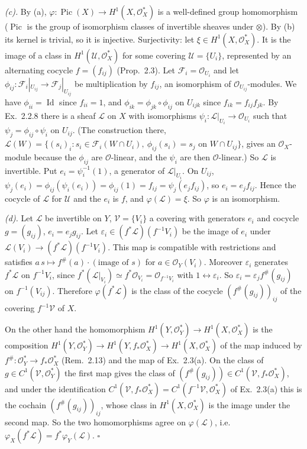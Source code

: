 \documentclass[11pt]{article}
\begin{document}
\emph{(c).} By (a), $\varphi:\operatorname{Pic}(X)\to H^1(X,\mathcal O_X^*)$ is a well-defined group homomorphism ($\operatorname{Pic}$ is the group of isomorphism classes of invertible sheaves under $\otimes$). By (b) its kernel is trivial, so it is injective. Surjectivity: let $\xi\in H^1(X,\mathcal O_X^*)$. It is the image of a class in $H^1(\mathcal U,\mathcal O_X^*)$ for some covering $\mathcal U=\{U_i\}$, represented by an alternating cocycle $f=(f_{ij})$ (Prop.~2.3). Let $\mathcal F_i=\mathcal O_{U_i}$ and let $\phi_{ij}:\mathcal F_i|_{U_{ij}}\to\mathcal F_j|_{U_{ij}}$ be multiplication by $f_{ij}$, an isomorphism of $\mathcal O_{U_{ij}}$-modules. We have $\phi_{ii}=\operatorname{Id}$ since $f_{ii}=1$, and $\phi_{ik}=\phi_{jk}\circ\phi_{ij}$ on $U_{ijk}$ since $f_{ik}=f_{ij}f_{jk}$. By Ex.~2.2.8 there is a sheaf $\mathcal L$ on $X$ with isomorphisms $\psi_i:\mathcal L|_{U_i}\to\mathcal O_{U_i}$ such that $\psi_j=\phi_{ij}\circ\psi_i$ on $U_{ij}$. (The construction there, $\mathcal L(W)=\{(s_i)_i:s_i\in\mathcal F_i(W\cap U_i),\ \phi_{ij}(s_i)=s_j\text{ on }W\cap U_{ij}\}$, gives an $\mathcal O_X$-module because the $\phi_{ij}$ are $\mathcal O$-linear, and the $\psi_i$ are then $\mathcal O$-linear.) So $\mathcal L$ is invertible. Put $e_i=\psi_i^{-1}(1)$, a generator of $\mathcal L|_{U_i}$. On $U_{ij}$, $\psi_j(e_i)=\phi_{ij}(\psi_i(e_i))=\phi_{ij}(1)=f_{ij}=\psi_j(e_jf_{ij})$, so $e_i=e_jf_{ij}$. Hence the cocycle of $\mathcal L$ for $\mathcal U$ and the $e_i$ is $f$, and $\varphi(\mathcal L)=\xi$. So $\varphi$ is an isomorphism.

\emph{(d).} Let $\mathcal L$ be invertible on $Y$, $\mathcal V=\{V_i\}$ a covering with generators $e_i$ and cocycle $g=(g_{ij})$, $e_i=e_jg_{ij}$. Let $\varepsilon_i\in(f^*\mathcal L)(f^{-1}V_i)$ be the image of $e_i$ under $\mathcal L(V_i)\to(f^*\mathcal L)(f^{-1}V_i)$. This map is compatible with restrictions and satisfies $a\,s\mapsto f^\#(a)\cdot(\text{image of }s)$ for $a\in\mathcal O_Y(V_i)$. Moreover $\varepsilon_i$ generates $f^*\mathcal L$ on $f^{-1}V_i$, since $f^*(\mathcal L|_{V_i})\simeq f^*\mathcal O_{V_i}=\mathcal O_{f^{-1}V_i}$ with $1\leftrightarrow\varepsilon_i$. So $\varepsilon_i=\varepsilon_jf^\#(g_{ij})$ on $f^{-1}(V_{ij})$. Therefore $\varphi(f^*\mathcal L)$ is the class of the cocycle $(f^\#(g_{ij}))_{ij}$ of the covering $f^{-1}\mathcal V$ of $X$.

On the other hand the homomorphism $H^1(Y,\mathcal O_Y^*)\to H^1(X,\mathcal O_X^*)$ is the composition $H^1(Y,\mathcal O_Y^*)\to H^1(Y,f_*\mathcal O_X^*)\to H^1(X,\mathcal O_X^*)$ of the map induced by $f^\#:\mathcal O_Y^*\to f_*\mathcal O_X^*$ (Rem.~2.13) and the map of Ex.~2.3(a). On the class of $g\in C^1(\mathcal V,\mathcal O_Y^*)$ the first map gives the class of $(f^\#(g_{ij}))\in C^1(\mathcal V,f_*\mathcal O_X^*)$, and under the identification $C^1(\mathcal V,f_*\mathcal O_X^*)=C^1(f^{-1}\mathcal V,\mathcal O_X^*)$ of Ex.~2.3(a) this is the cochain $(f^\#(g_{ij}))_{ij}$, whose class in $H^1(X,\mathcal O_X^*)$ is the image under the second map. So the two homomorphisms agree on $\varphi(\mathcal L)$, i.e. $\varphi_X(f^*\mathcal L)=f^*\varphi_Y(\mathcal L)$. \hfill$\square$
\end{document}
